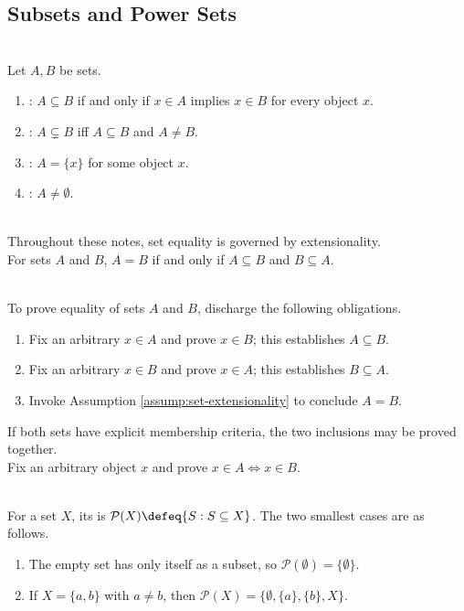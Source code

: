 \subsection{Subsets and Power Sets}

\begin{definition} \label{def:proper-subsets-singletons-and-nonempty} \\
Let $A,B$ be sets.
\begin{enumerate}[label=(\roman*)]
\setlength{\itemsep}{0pt}
\item {}: $A\subseteq B$ if and only if $x\in A$ implies $x\in B$ for every object $x$.
\item {}: $A\subsetneq B$ iff $A\subseteq B$ and $A\neq B$.
\item {}: $A=\{x\}$ for some object $x$.
\item {}: $A\neq\emptyset$.
\end{enumerate}
\end{definition}

\begin{assumption} \label{assump:set-extensionality} \\
Throughout these notes, set equality is governed by extensionality.\\
For sets $A$ and $B$, $A=B$ if and only if $A\subseteq B$ and $B\subseteq A$.
\end{assumption}

\begin{proofmethod} \label{meth:proof-by-containment} \\
To prove equality of sets $A$ and $B$, discharge the following obligations.
\begin{enumerate}[label=(\roman*)]
\setlength{\itemsep}{0pt}
\item Fix an arbitrary $x\in A$ and prove $x\in B$; this establishes $A\subseteq B$.
\item Fix an arbitrary $x\in B$ and prove $x\in A$; this establishes $B\subseteq A$.
\item Invoke Assumption \ref{assump:set-extensionality} to conclude $A=B$.
\end{enumerate}
If both sets have explicit membership criteria, the two inclusions may be proved together.\\
Fix an arbitrary object $x$ and prove $x\in A\Longleftrightarrow x\in B$.
\end{proofmethod}

\begin{definition} \label{def:power-set} \\
For a set $X$, its  is $\mathcal{P}(X)\defeq\{S:S\subseteq X\}$.
The two smallest cases are as follows.
\begin{enumerate}[label=(\roman*)]
\setlength{\itemsep}{0pt}
\item The empty set has only itself as a subset, so $\mathcal{P}(\emptyset)=\{\emptyset\}$.
\item If $X=\{a,b\}$ with $a\neq b$, then $\mathcal{P}(X)=\{\emptyset,\{a\},\{b\},X\}$.
\end{enumerate}
\end{definition}
